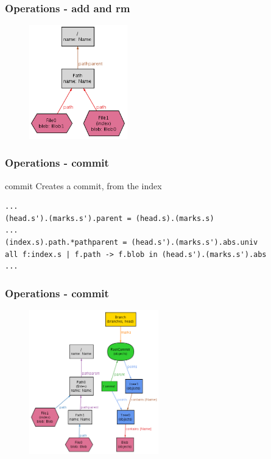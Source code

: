 \documentclass{beamer}
\begin{document}
\begin{frame}[fragile]
   \frametitle{Operations - add and rm}
   \begin{figure}
      \centering
      \includegraphics[width=0.38\textwidth]{images/add2.png}
   \end{figure}
\end{frame}

\begin{frame}[fragile]
   \frametitle{Operations - commit}
   \begin{block}{commit}
      Creates a commit, from the index
   \end{block}
   \tiny
   \begin{lstlisting}
...
(head.s').(marks.s').parent = (head.s).(marks.s)
...
(index.s).path.*pathparent = (head.s').(marks.s').abs.univ
all f:index.s | f.path -> f.blob in (head.s').(marks.s').abs
...
   \end{lstlisting}
\end{frame}

\begin{frame}[fragile]
   \frametitle{Operations - commit}
   \begin{figure}
      \centering
      \includegraphics[width=0.5\textwidth]{images/commit1.png}
   \end{figure}
\end{frame}
\end{document}
